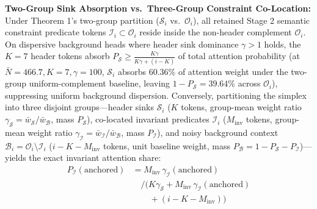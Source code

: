 \documentclass[conference,10pt]{IEEEtran}
\begin{document}
\textbf{Two-Group Sink Absorption vs.\ Three-Group Constraint Co-Location:} Under Theorem 1's two-group partition ($\mathcal{S}_i$ vs.\ $\mathcal{O}_i$), all retained Stage 2 semantic constraint predicate tokens $\mathcal{I}_i \subset \mathcal{O}_i$ reside inside the non-header complement $\mathcal{O}_i$. On dispersive background heads where header sink dominance $\gamma > 1$ holds, the $K=7$ header tokens absorb $P_{\mathcal{S}} \ge \frac{K\gamma}{K\gamma + (i-K)}$ of total attention probability (at $\bar{N}=466.7, K=7, \gamma=100$, $\mathcal{S}_i$ absorbs $60.36\%$ of attention weight under the two-group uniform-complement baseline, leaving $1 - P_{\mathcal{S}} = 39.64\%$ across $\mathcal{O}_i$), suppressing uniform background dispersion. Conversely, partitioning the simplex into three disjoint groups---header sinks $\mathcal{S}_i$ ($K$ tokens, group-mean weight ratio $\gamma_{\mathcal{S}} = \bar{w}_{\mathcal{S}}/\bar{w}_{\mathcal{B}}$, mass $P_{\mathcal{S}}$), co-located invariant predicates $\mathcal{I}_i$ ($M_{\text{inv}}$ tokens, group-mean weight ratio $\gamma_{\mathcal{I}} = \bar{w}_{\mathcal{I}}/\bar{w}_{\mathcal{B}}$, mass $P_{\mathcal{I}}$), and noisy background context $\mathcal{B}_i = \mathcal{O}_i \setminus \mathcal{I}_i$ ($i - K - M_{\text{inv}}$ tokens, unit baseline weight, mass $P_{\mathcal{B}} = 1 - P_{\mathcal{S}} - P_{\mathcal{I}}$)---yields the exact invariant attention share:
\begin{equation}
\label{eq:three_group_partition}
\begin{split}
P_{\mathcal{I}}(\text{anchored}) &= M_{\text{inv}}\,\gamma_{\mathcal{I}}(\text{anchored}) \\
&\quad \Big/ \big( K\gamma_{\mathcal{S}} + M_{\text{inv}}\,\gamma_{\mathcal{I}}(\text{anchored}) \\
&\qquad + (i - K - M_{\text{inv}}) \big)
\end{split}
\end{equation}
\end{document}

